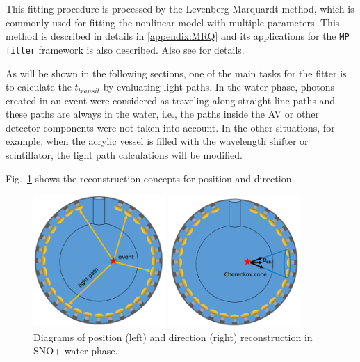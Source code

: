 This fitting procedure is processed by the Levenberg-Marquardt method, which is commonly used for fitting the nonlinear model with multiple parameters. This method is described in details in \ref{appendix:MRQ} and its applications for the \texttt{MP fitter} framework is also described. Also see \cite{gregory2005bayesian, press2007numerical} for details.

As will be shown in the following sections, one of the main tasks for the fitter is to calculate the $t_{transit}$ by evaluating light paths. In the water phase, photons created in an event were considered as traveling along straight line paths and these paths are always in the water, i.e., the paths inside the AV or other detector components were not taken into account. In the other situations, for example, when the acrylic vessel is filled with the wavelength shifter or scintillator, the light path calculations will be modified.   

Fig.~\ref{mpwdiagram} shows the reconstruction concepts for position and direction.
\begin{figure}[htbp]
	\centering
	\begin{minipage}[t]{0.45\textwidth}
		\centering
		\includegraphics[width=5cm]{mpwDiagram.png}
	\end{minipage}
	\begin{minipage}[t]{0.4\textwidth}
		\centering
		\includegraphics[width=5cm]{mpwDiagram2.png}
	\end{minipage}
	\caption{Diagrams of position (left) and direction (right) reconstruction in SNO+ water phase.}
	\label{mpwdiagram}
\end{figure}


